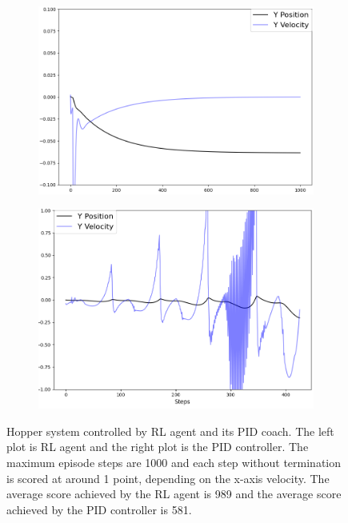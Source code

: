 \documentclass[journal]{IEEEtran}
\begin{document}
\begin{figure}
\centering
\begin{subfigure}{0.24\textwidth}
  \centering
  \includegraphics[width=\linewidth]{hopper_RL.png}
\end{subfigure}
\hfill
\begin{subfigure}{.24\textwidth}
  \centering
  \includegraphics[width=\linewidth]{hopper_PID.png}
\end{subfigure}
\caption{Hopper system controlled by RL agent and its PID coach. The left plot is RL agent and the right plot is the PID controller. The maximum episode steps are 1000 and each step without termination is scored at around 1 point, depending on the x-axis velocity. The average score achieved by the RL agent is 989 and the average score achieved by the PID controller is 581.}
\label{fig:hopper}
\end{figure}
\end{document}
